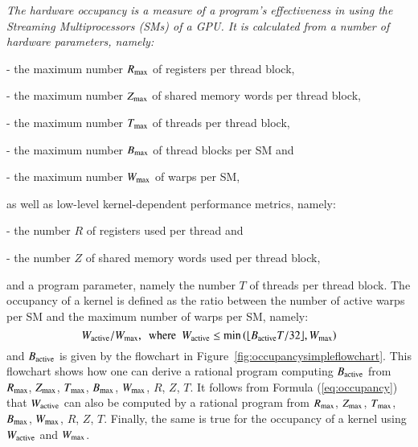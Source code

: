 \begin{example}
\label{ex:cuda}
{\em
The hardware {\em occupancy} is a measure of a program's effectiveness in using
the Streaming Multiprocessors (SMs) of a GPU.
It is calculated from a number of hardware parameters, namely:
\begin{itemizeshort}
\item[-] the maximum number $R_{\rm max}$ of registers per thread block,
\item[-] the maximum number $Z_{\rm max}$ of shared memory words per thread block,
\item[-] the maximum number $T_{\rm max}$ of threads per thread block,
\item[-] the maximum number $B_{\rm max}$ of thread blocks per SM and 
\item[-] the maximum number $W_{\rm max}$ of warps per SM,
\end{itemizeshort}
as well as low-level kernel-dependent performance metrics, namely:
\begin{itemizeshort}
\item[-] the number $R$ of registers used per thread and 
\item[-] the number $Z$ of shared memory words used per thread block,
\end{itemizeshort}
and a program parameter, namely the 
number $T$ of threads per thread block.
The occupancy of a {\cuda} kernel is defined as
the ratio between the number of active warps
per SM and the maximum number of warps per SM, namely:
\begin{equation}
\label{eq:occupancy}
W_{\rm active} / W_{\rm max}, \ \ {\rm where} \ \ 
    W_{\rm active} \fixed{\leq}{Changed to an inequality to highlight the
    upper bound given by this equation: Fine.} \min \left( \lfloor B_{\rm active} T / 32 \rfloor, W_{\rm max}  \right)
\end{equation}
and $B_{\rm active}$ is given by the flowchart
in Figure~\ref{fig:occupancysimpleflowchart}.
This flowchart shows
how one can derive a rational program computing
$B_{\rm active}$ from $R_{\rm max}$, $Z_{\rm max}$,
$T_{\rm max}$, $B_{\rm max}$, $W_{\rm max}$, $R$, $Z$, $T$.
It follows from Formula (\ref{eq:occupancy})
that $W_{\rm active}$ can also be computed 
by a rational program from $R_{\rm max}$, $Z_{\rm max}$,
$T_{\rm max}$, $B_{\rm max}$, $W_{\rm max}$, $R$, $Z$, $T$.
Finally, the same is true for the occupancy of a {\cuda} kernel
using $W_{\rm active}$ and $W_{\rm max}$.
}
\end{example}